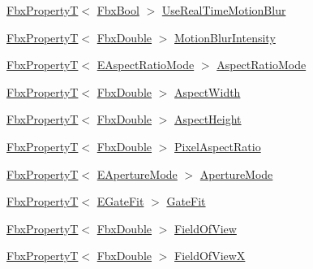 \begin{DoxyCompactItemize}
\item 
\hyperlink{class_fbx_property_t}{Fbx\+PropertyT}$<$ \hyperlink{fbxtypes_8h_a92e0562b2fe33e76a242f498b362262e}{Fbx\+Bool} $>$ \hyperlink{class_fbx_camera_a99d0cb2281144454e44128d66be54b26}{Use\+Real\+Time\+Motion\+Blur}
\item 
\hyperlink{class_fbx_property_t}{Fbx\+PropertyT}$<$ \hyperlink{fbxtypes_8h_a171e72a1c46fc15c1a6c9c31948c1c5b}{Fbx\+Double} $>$ \hyperlink{class_fbx_camera_aef324a28772e42e910b983642b635769}{Motion\+Blur\+Intensity}
\item 
\hyperlink{class_fbx_property_t}{Fbx\+PropertyT}$<$ \hyperlink{class_fbx_camera_a2135478bb5fd6985835c14b11e1fccda}{E\+Aspect\+Ratio\+Mode} $>$ \hyperlink{class_fbx_camera_ad140535acab4a663a6f4cb51ef603e7a}{Aspect\+Ratio\+Mode}
\item 
\hyperlink{class_fbx_property_t}{Fbx\+PropertyT}$<$ \hyperlink{fbxtypes_8h_a171e72a1c46fc15c1a6c9c31948c1c5b}{Fbx\+Double} $>$ \hyperlink{class_fbx_camera_ada3746eb834815c224eb5fc223fa35ac}{Aspect\+Width}
\item 
\hyperlink{class_fbx_property_t}{Fbx\+PropertyT}$<$ \hyperlink{fbxtypes_8h_a171e72a1c46fc15c1a6c9c31948c1c5b}{Fbx\+Double} $>$ \hyperlink{class_fbx_camera_aabeade4a36213c65d7a4f45aeceebff6}{Aspect\+Height}
\item 
\hyperlink{class_fbx_property_t}{Fbx\+PropertyT}$<$ \hyperlink{fbxtypes_8h_a171e72a1c46fc15c1a6c9c31948c1c5b}{Fbx\+Double} $>$ \hyperlink{class_fbx_camera_a3fbab252bb6925578cc965f0383592b8}{Pixel\+Aspect\+Ratio}
\item 
\hyperlink{class_fbx_property_t}{Fbx\+PropertyT}$<$ \hyperlink{class_fbx_camera_addeea6fc943ce5f087dbc54c142f890e}{E\+Aperture\+Mode} $>$ \hyperlink{class_fbx_camera_afa8019b2027da3798e13bb1126c5941d}{Aperture\+Mode}
\item 
\hyperlink{class_fbx_property_t}{Fbx\+PropertyT}$<$ \hyperlink{class_fbx_camera_aeef0bf29c16fe5f08815fb33402330dd}{E\+Gate\+Fit} $>$ \hyperlink{class_fbx_camera_a72892e0ca040266ffc5ede12235db68a}{Gate\+Fit}
\item 
\hyperlink{class_fbx_property_t}{Fbx\+PropertyT}$<$ \hyperlink{fbxtypes_8h_a171e72a1c46fc15c1a6c9c31948c1c5b}{Fbx\+Double} $>$ \hyperlink{class_fbx_camera_acec3ce4b786d019a16a2de9f23ff42d8}{Field\+Of\+View}
\item 
\hyperlink{class_fbx_property_t}{Fbx\+PropertyT}$<$ \hyperlink{fbxtypes_8h_a171e72a1c46fc15c1a6c9c31948c1c5b}{Fbx\+Double} $>$ \hyperlink{class_fbx_camera_a2e0c65d8225c5f73c6cf9a927a0523fb}{Field\+Of\+ViewX}
\item 

\end{DoxyCompactItemize}
